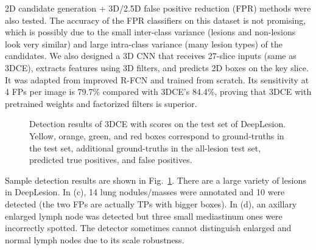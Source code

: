 \documentclass[a4paper]{llncs}
\def\Fig#1{{Fig.\ \ref{fig:#1}}}
\begin{document}
2D candidate generation + 3D/2.5D false positive reduction (FPR) methods were also tested. The accuracy of the FPR classifiers on this dataset is not promising, which is possibly due to the small inter-class variance (lesions and non-lesions look very similar) and large intra-class variance (many lesion types) of the candidates. We also designed a 3D CNN that receives 27-slice inputs (same as 3DCE), extracts features using 3D filters, and predicts 2D boxes on the key slice. It was adapted from improved R-FCN and trained from scratch. Its sensitivity at 4 FPs per image is 79.7\% compared with 3DCE's 84.4\%, proving that 3DCE with pretrained weights and factorized filters is superior.

\begin{figure}[]
	\centering
	\caption{Detection results of 3DCE with scores  on the test set of DeepLesion. Yellow, orange, green, and red boxes correspond to ground-truths in the test set, additional ground-truths in the all-lesion test set, predicted true positives, and false positives.
	}
	\label{fig:det_res} \end{figure}

Sample detection results are shown in \Fig{det_res}. There are a large variety of lesions in DeepLesion. In (c), 14 lung nodules/masses were annotated and 10 were detected (the two FPs are actually TPs with bigger boxes). In (d), an axillary enlarged lymph node was detected but three small mediastinum ones were incorrectly spotted. The detector sometimes cannot distinguish enlarged and normal lymph nodes due to its scale robustness.
\end{document}

